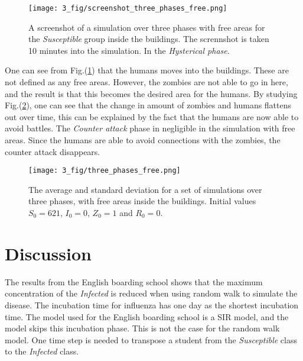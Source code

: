 \documentclass[%
twoside,                 %
final,                   %
chapterprefix=true,      %
open=right               %
10pt]{book}
\begin{document}
\vspace{3mm}




\vspace{3mm}




\begin{figure}[ht]
  \centerline{\texttt{[image: 3\_fig/screenshot\_three\_phases\_free.png]}}
  \caption{
  \label{fig:screenshot_three_phases_free} A screenshot of a simulation over three phases with free areas for the \emph{Susceptible} group inside the buildings. The scrennshot is taken 10 minutes into the simulation. In the \emph{Hysterical phase}.
  }
\end{figure}


One can see from Fig.(\ref{fig:screenshot_three_phases_free}) that the humans moves into the buildings. These are not defined as any free areas. However, the zombies are not able to go in here, and the result is that this becomes the desired area for the humans. By studying Fig.(\ref{fig:three_phases_free}), one can see that the change in amount of zombies and humans flattens out over time, this can be explained by the fact that the humans are now able to avoid battles. The \emph{Counter attack} phase in negligible in the simulation with free areas. Since the humans are able to avoid connections with the zombies, the counter attack disappears.  


\begin{figure}[ht]
  \centerline{\texttt{[image: 3\_fig/three\_phases\_free.png]}}
  \caption{
  \label{fig:three_phases_free} The average and standard deviation for a set of simulations over three phases, with free areas inside the buildings. Initial values $S_0 = 621$, $I_0 = 0$, $Z_0=1$ and $R_0=0$.
  }
\end{figure}






\section{Discussion}
The results from the English boarding school shows that the maximum concentration of the \emph{Infected} is reduced when using random walk to simulate the disease. The incubation time for influenza has one day as the shortest incubation time. The model used for the English boarding school is a SIR model, and the model skips this incubation phase. This is not the case for the random walk model. One time step is needed to transpose a student from the \emph{Susceptible} class to the \emph{Infected} class. 
\end{document}
